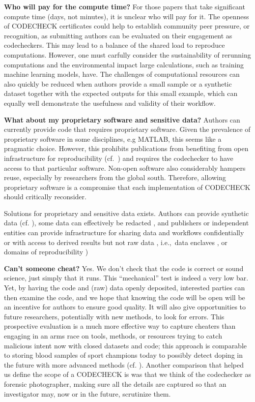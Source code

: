 \documentclass[12pt]{article}
\begin{document}
\textbf{Who will pay for the compute time?}
For those papers that take significant compute
time (days, not minutes), it is unclear who will pay for it.
The openness of CODECHECK certificates could help to establish community
peer pressure, or recognition, as submitting authors can be evaluated on their engagement
as codecheckers. This may lead to a balance of the shared load to reproduce
computations.
However, one must carfully consider the sustainability of rerunning computations and the
environmental impact large calculations, such as training machine learning models, have.
The challenges of computational resources can also quickly be reduced when
authors provide a small sample or a synthetic dataset together with the
expected outputs for this small example, which can equally well demonstrate the 
usefulness and validity of their workflow.

\textbf{What about my proprietary software and sensitive data?}
Authors can currently provide code that requires
proprietary software. Given the prevalence of proprietary software in
some disciplines, e.g MATLAB, this seems like a pragmatic choice.
However, this prohibits publications from benefiting from open infrastructure for reproducibility
(cf.~\cite{konkol_publishing_2020,perkel_make_2019})
and requires the codechecker to have access to that particular software.
Non-open software also considerably hampers reuse, especially by researchers
from the global south. Therefore, allowing proprietary software is a compromise
that each implementation of CODECHECK should critically reconsider.

Solutions for proprietary and sensitive data exists.
Authors can provide synthetic data (cf. \cite{shannon_opening_2018}), some
data can effectively be redacted \cite{oloughlin_data_2015}, and publishers or
independent entities can provide infrastructure for sharing data and workflows
confidentially \cite{perignon_certify_2019} or with access to derived results
but not raw data \cite{shannon_opening_2018},
i.e.,~data enclaves \cite{foster_research_2018},
or domains of reproducibility \cite{harris_more_2017})

\textbf{Can't someone cheat?} Yes. We don't check that the code is correct or
sound science,
just simply that it runs. This ``mechanical'' test is indeed a very low bar.
Yet, by having the code and (raw) data openly deposited, interested parties can
then examine the code, and we hope that knowing the code will be open will
be an incentive for authors to ensure good quality.
It will also give opportunities
to future researchers, potentially with new methods, to look for errors.
This prospective evaluation is a much more effective way to capture cheaters than engaging in an arms race on tools, methods, or resources trying to catch malicious intent now with closed datasets and code; this approach is comparable to storing blood samples of sport champions today to possibly detect doping in the future with more advanced methods (cf. \cite{everythinghertz97}).
Another comparison that helped us define the scope of a CODECHECK is was that we think of the codechecker as forensic photographer, making sure all the details
are captured so that an investigator may, now or in the future, scrutinize
them.
\end{document}
